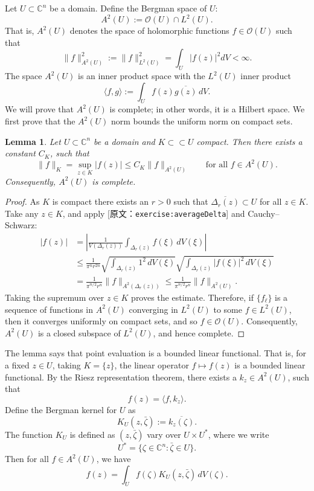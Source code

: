 \documentclass[UTF8,11pt]{ctexart}
\newtheorem*{lemma}{Lemma}
\theoremstyle{definition}
\newcommand{\C}{\mathbb C}
\newcommand{\sO}{\mathscr O}
\newcommand{\sourceref}[1]{\textnormal{[原文：\nolinkurl{#1}]}}
\newcommand{\exerciseref}[1]{\sourceref{#1}}
\begin{document}
Let $U\subset\C^n$ be a domain. Define the Bergman space of $U$:
\[A^2(U):=\sO(U)\cap L^2(U).\]
That is, $A^2(U)$ denotes the space of holomorphic functions $f\in\sO(U)$ such that
\[\|f\|_{A^2(U)}^2:=\|f\|_{L^2(U)}^2=\int_U|f(z)|^2dV<\infty.\]
The space $A^2(U)$ is an inner product space with the $L^2(U)$ inner product
\[\langle f,g\rangle:=\int_U f(z)\overline{g(z)}\,dV.\]
We will prove that $A^2(U)$ is complete; in other words, it is a Hilbert space. We first prove that the $A^2(U)$ norm bounds the uniform norm on compact sets.
\begin{lemma}\label{lemma:bergmanKbound}
Let $U\subset\C^n$ be a domain and $K\subset\subset U$ compact. Then there exists a constant $C_K$, such that
\[\|f\|_K=\sup_{z\in K}|f(z)|\leq C_K\|f\|_{A^2(U)}\qquad\text{for all }f\in A^2(U).\]
Consequently, $A^2(U)$ is complete.
\end{lemma}
\begin{proof}
As $K$ is compact there exists an $r>0$ such that $\overline{\Delta_r(z)}\subset U$ for all $z\in K$. Take any $z\in K$, and apply \exerciseref{exercise:averageDelta} and Cauchy--Schwarz:
\begin{align*}
|f(z)|&=\left|\frac1{V(\Delta_r(z))}\int_{\Delta_r(z)}f(\xi)\,dV(\xi)\right|\\
&\leq\frac1{\pi^nr^{2n}}\sqrt{\int_{\Delta_r(z)}1^2\,dV(\xi)}\sqrt{\int_{\Delta_r(z)}|f(\xi)|^2\,dV(\xi)}\\
&=\frac1{\pi^{n/2}r^n}\|f\|_{A^2(\Delta_r(z))}\leq\frac1{\pi^{n/2}r^n}\|f\|_{A^2(U)}.
\end{align*}
Taking the supremum over $z\in K$ proves the estimate. Therefore, if $\{f_\ell\}$ is a sequence of functions in $A^2(U)$ converging in $L^2(U)$ to some $f\in L^2(U)$, then it converges uniformly on compact sets, and so $f\in\sO(U)$. Consequently, $A^2(U)$ is a closed subspace of $L^2(U)$, and hence complete.
\end{proof}
The lemma says that point evaluation is a bounded linear functional. That is, for a fixed $z\in U$, taking $K=\{z\}$, the linear operator $f\mapsto f(z)$ is a bounded linear functional. By the Riesz representation theorem, there exists a $k_z\in A^2(U)$, such that
\[f(z)=\langle f,k_z\rangle.\]
Define the Bergman kernel for $U$ as
\[K_U(z,\bar\zeta):=\overline{k_z(\zeta)}.\]
The function $K_U$ is defined as $(z,\bar\zeta)$ vary over $U\times U^*$, where we write
\[U^*=\{\zeta\in\C^n:\bar\zeta\in U\}.\]
Then for all $f\in A^2(U)$, we have
\begin{equation}\label{eq:repropropBergman}
f(z)=\int_U f(\zeta)K_U(z,\bar\zeta)\,dV(\zeta).
\end{equation}
\end{document}

